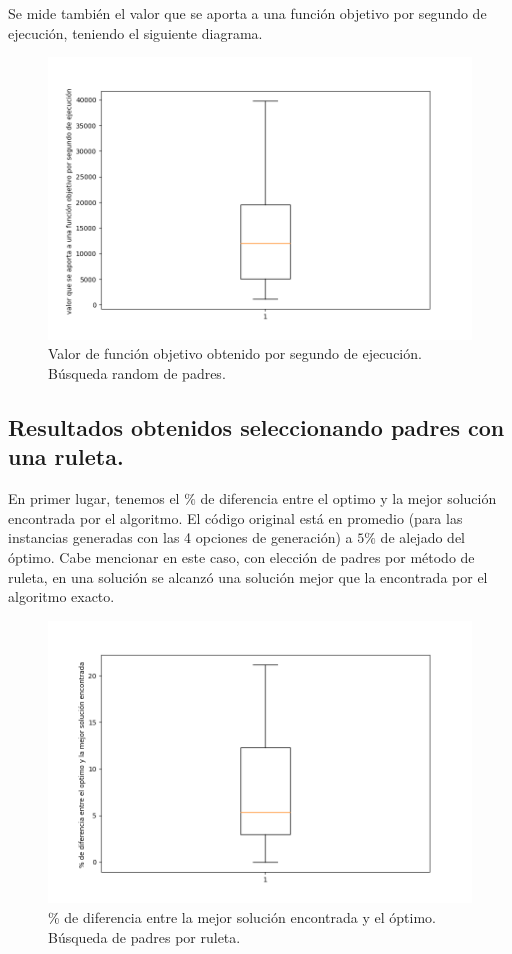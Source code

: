 \documentclass{article}
\begin{document}
	Se mide también el valor que se aporta a una función objetivo por segundo de ejecución, teniendo el siguiente diagrama.
	\newpage
		\begin{figure}[h!]
		\centering
		\includegraphics[width=0.7\linewidth]{Figure_2.png}
		\caption{Valor de función objetivo obtenido por segundo de ejecución. Búsqueda random de padres.}
		\label{fig:imagen2}
		\end{figure}
	
	    \subsection{ Resultados obtenidos seleccionando padres con una ruleta.}
	    
	    En primer lugar, tenemos el $\%$ de diferencia entre el optimo y la mejor solución encontrada por el algoritmo. El código original está en promedio (para las instancias generadas con las 4 opciones de generación) a $5\%$ de alejado del óptimo. Cabe mencionar en este caso, con elección de padres por método de ruleta, en una solución se alcanzó una solución mejor que la encontrada por el algoritmo exacto.
	    
	    	\begin{figure}[h!]
	    	\centering
	    	\includegraphics[width=0.7\linewidth]{Figure_3.png}
	    	\caption{\% de diferencia entre la mejor solución encontrada y el óptimo. Búsqueda de padres por ruleta.}
	    	\label{fig:imagen3}
	    	\end{figure}
    	
\end{document}
